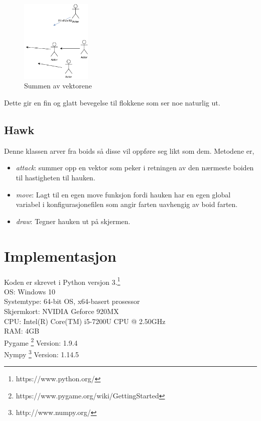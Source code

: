 {\begin{figure}[hbt!]
{\centering
    \includegraphics[width=0.30\textwidth]{rulelast.pdf}
    \caption{Summen av vektorene}
    \label{sumvektor}
\par}
\end{figure}

Dette gir en fin og glatt bevegelse til flokkene som ser noe naturlig ut.


\subsection{Hawk}

Denne klassen arver fra boids så disse vil oppføre seg likt som dem. Metodene er,

\begin{itemize}
    \item \emph{attack}: summer opp en vektor som peker i retningen av den nærmeste boiden til hastigheten til hauken.
    \item \emph{move}: Lagt til en egen move funksjon fordi hauken har en egen global variabel i konfigurasjonefilen som angir farten uavhengig av boid farten.
    \item \emph{draw}: Tegner hauken ut på skjermen.
\end{itemize}





\section{Implementasjon}
Koden er skrevet i Python versjon 3.\footnote{https://www.python.org/}\\
OS: Windows 10\\
Systemtype: 64-bit OS, x64-basert prosessor\\
Skjermkort: NVIDIA Geforce 920MX\\
CPU: Intel(R) Core(TM) i5-7200U CPU @ 2.50GHz\\
RAM: 4GB\\
Pygame \footnote{https://www.pygame.org/wiki/GettingStarted} Version: 1.9.4\\
Nympy \footnote{http://www.numpy.org/} Version: 1.14.5\\






}
